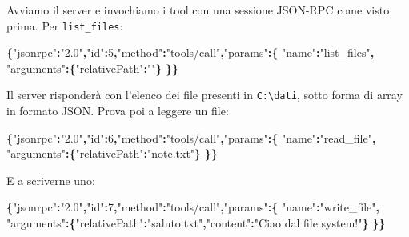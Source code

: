 \documentclass[
  italian,
  10pt,
]{book}
\newenvironment{Shaded}{\begin{snugshade}}{\end{snugshade}}
\newcommand{\DataTypeTok}[1]{\textcolor[rgb]{0.13,0.29,0.53}{#1}}
\newcommand{\DecValTok}[1]{\textcolor[rgb]{0.00,0.00,0.81}{#1}}
\newcommand{\FunctionTok}[1]{\textcolor[rgb]{0.13,0.29,0.53}{\textbf{#1}}}
\newcommand{\StringTok}[1]{\textcolor[rgb]{0.31,0.60,0.02}{#1}}
\begin{document}
Avviamo il server e invochiamo i tool con una sessione JSON-RPC come
visto prima. Per \texttt{list\_files}:

\begin{Shaded}
\begin{Highlighting}[]
\FunctionTok{\{}\DataTypeTok{"jsonrpc"}\FunctionTok{:}\StringTok{"2.0"}\FunctionTok{,}\DataTypeTok{"id"}\FunctionTok{:}\DecValTok{5}\FunctionTok{,}\DataTypeTok{"method"}\FunctionTok{:}\StringTok{"tools/call"}\FunctionTok{,}\DataTypeTok{"params"}\FunctionTok{:\{}
  \DataTypeTok{"name"}\FunctionTok{:}\StringTok{"list\_files"}\FunctionTok{,}
  \DataTypeTok{"arguments"}\FunctionTok{:\{}\DataTypeTok{"relativePath"}\FunctionTok{:}\StringTok{""}\FunctionTok{\}}
\FunctionTok{\}\}}
\end{Highlighting}
\end{Shaded}

Il server risponderà con l'elenco dei file presenti in
\texttt{C:\textbackslash{}dati}, sotto forma di array in formato JSON.
Prova poi a leggere un file:

\begin{Shaded}
\begin{Highlighting}[]
\FunctionTok{\{}\DataTypeTok{"jsonrpc"}\FunctionTok{:}\StringTok{"2.0"}\FunctionTok{,}\DataTypeTok{"id"}\FunctionTok{:}\DecValTok{6}\FunctionTok{,}\DataTypeTok{"method"}\FunctionTok{:}\StringTok{"tools/call"}\FunctionTok{,}\DataTypeTok{"params"}\FunctionTok{:\{}
  \DataTypeTok{"name"}\FunctionTok{:}\StringTok{"read\_file"}\FunctionTok{,}
  \DataTypeTok{"arguments"}\FunctionTok{:\{}\DataTypeTok{"relativePath"}\FunctionTok{:}\StringTok{"note.txt"}\FunctionTok{\}}
\FunctionTok{\}\}}
\end{Highlighting}
\end{Shaded}

E a scriverne uno:

\begin{Shaded}
\begin{Highlighting}[]
\FunctionTok{\{}\DataTypeTok{"jsonrpc"}\FunctionTok{:}\StringTok{"2.0"}\FunctionTok{,}\DataTypeTok{"id"}\FunctionTok{:}\DecValTok{7}\FunctionTok{,}\DataTypeTok{"method"}\FunctionTok{:}\StringTok{"tools/call"}\FunctionTok{,}\DataTypeTok{"params"}\FunctionTok{:\{}
  \DataTypeTok{"name"}\FunctionTok{:}\StringTok{"write\_file"}\FunctionTok{,}
  \DataTypeTok{"arguments"}\FunctionTok{:\{}\DataTypeTok{"relativePath"}\FunctionTok{:}\StringTok{"saluto.txt"}\FunctionTok{,}\DataTypeTok{"content"}\FunctionTok{:}\StringTok{"Ciao dal file system!"}\FunctionTok{\}}
\FunctionTok{\}\}}
\end{Highlighting}
\end{Shaded}
\end{document}
